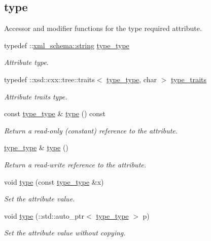 \subsection*{type}
\label{_amgrp599dcce2998a6b40b1e38e8c6006cb0a}%
Accessor and modifier functions for the type required attribute. \begin{DoxyCompactItemize}
\item 
typedef \+::\hyperlink{namespacexml__schema_aefbaf353f9a0043af46d23d9040ef268}{xml\+\_\+schema\+::string} \hyperlink{classVTKFile__t_ac1f3484e4fde414849ede43a00955f76}{type\+\_\+type}
\begin{DoxyCompactList}\small\item\em Attribute type. \end{DoxyCompactList}\item 
typedef \+::xsd\+::cxx\+::tree\+::traits$<$ \hyperlink{classVTKFile__t_ac1f3484e4fde414849ede43a00955f76}{type\+\_\+type}, char $>$ \hyperlink{classVTKFile__t_aee4ac167e843e9def1be4f43ad930391}{type\+\_\+traits}
\begin{DoxyCompactList}\small\item\em Attribute traits type. \end{DoxyCompactList}\item 
const \hyperlink{classVTKFile__t_ac1f3484e4fde414849ede43a00955f76}{type\+\_\+type} \& \hyperlink{classVTKFile__t_a5c23301c79cc6a376fe2abce533b2cf7}{type} () const 
\begin{DoxyCompactList}\small\item\em Return a read-\/only (constant) reference to the attribute. \end{DoxyCompactList}\item 
\hyperlink{classVTKFile__t_ac1f3484e4fde414849ede43a00955f76}{type\+\_\+type} \& \hyperlink{classVTKFile__t_abcc8ab822fa4f9e5e5294f5d8cff05c2}{type} ()
\begin{DoxyCompactList}\small\item\em Return a read-\/write reference to the attribute. \end{DoxyCompactList}\item 
void \hyperlink{classVTKFile__t_a6423eb2dc7fa367417df87de4921301e}{type} (const \hyperlink{classVTKFile__t_ac1f3484e4fde414849ede43a00955f76}{type\+\_\+type} \&x)
\begin{DoxyCompactList}\small\item\em Set the attribute value. \end{DoxyCompactList}\item 
void \hyperlink{classVTKFile__t_a380c8628fd1095c88a80a1804837c213}{type} (\+::std\+::auto\+\_\+ptr$<$ \hyperlink{classVTKFile__t_ac1f3484e4fde414849ede43a00955f76}{type\+\_\+type} $>$ p)
\begin{DoxyCompactList}\small\item\em Set the attribute value without copying. \end{DoxyCompactList}\end{DoxyCompactItemize}
